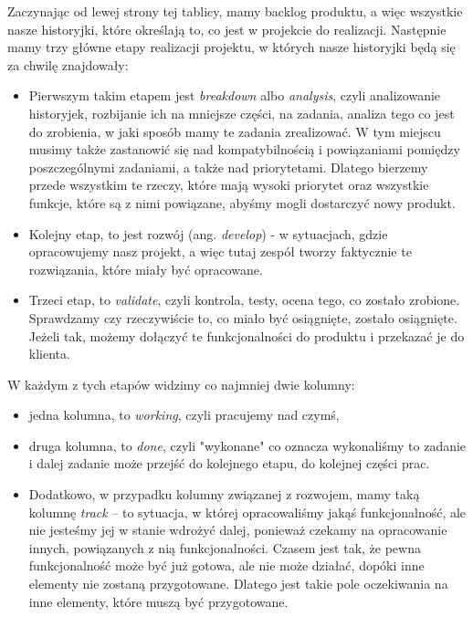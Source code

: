 Zaczynając od lewej strony tej tablicy, mamy backlog produktu, a więc wszystkie nasze historyjki,
które określają to, co jest w projekcie do realizacji.
Następnie mamy trzy główne etapy realizacji projektu, w których nasze historyjki będą się za chwilę znajdowały:

\begin{itemize}
	\item Pierwszym takim etapem jest \textit{breakdown} albo \textit{analysis}, czyli analizowanie historyjek,
	rozbijanie ich na mniejsze części, na zadania, analiza tego co jest do zrobienia, w jaki sposób mamy te zadania zrealizować.
	W tym miejscu musimy także zastanowić się nad kompatybilnością i powiązaniami pomiędzy poszczególnymi zadaniami,
	a także nad priorytetami. Dlatego bierzemy przede wszystkim te rzeczy, które mają wysoki priorytet oraz wszystkie funkcje,
	które są z nimi powiązane, abyśmy mogli dostarczyć nowy produkt.
	\item Kolejny etap, to jest rozwój (ang. \textit{develop}) - w sytuacjach, gdzie opracowujemy nasz projekt,
	a więc tutaj zespół tworzy faktycznie te rozwiązania, które miały być opracowane.
	\item Trzeci etap, to \textit{validate}, czyli kontrola, testy, ocena tego, co zostało zrobione.
	Sprawdzamy czy rzeczywiście to, co miało być osiągnięte, zostało osiągnięte.
	Jeżeli tak, możemy dołączyć te funkcjonalności do produktu i przekazać je do klienta.
\end{itemize}

W każdym z tych etapów widzimy co najmniej dwie kolumny:

\begin{itemize}
	\item jedna kolumna, to \textit{working}, czyli pracujemy nad czymś,
	\item druga kolumna, to \textit{done}, czyli "wykonane" co oznacza wykonaliśmy to zadanie
	i dalej zadanie może przejść do kolejnego etapu, do kolejnej części prac.
	\item Dodatkowo, w przypadku kolumny związanej z rozwojem, mamy taką kolumnę \textit{track}
	– to sytuacja, w której opracowaliśmy jakąś funkcjonalność,
	ale nie jesteśmy jej w stanie wdrożyć dalej, ponieważ czekamy na opracowanie innych,
	powiązanych z nią funkcjonalności.
	Czasem jest tak, że pewna funkcjonalność może być już gotowa, ale nie może działać,
	dopóki inne elementy nie zostaną przygotowane.
	Dlatego jest takie pole oczekiwania na inne elementy, które muszą być przygotowane.
\end{itemize}

